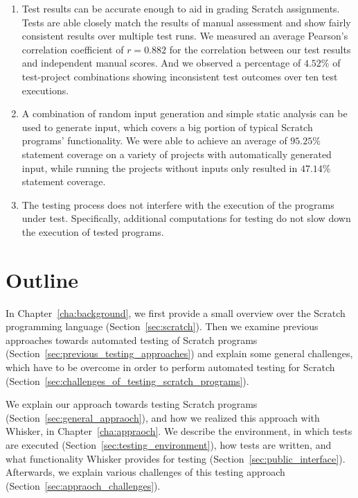 \begin{enumerate}[(1)]
    \item Test results can be accurate enough to aid in grading Scratch assignments.
        Tests are able closely match the results of manual assessment and show fairly consistent results over multiple test runs.
        We measured an average Pearson's correlation coefficient of $r = 0.882$ for the correlation
        between our test results and independent manual scores.
        And we observed a percentage of $4.52\%$ of test-project combinations showing inconsistent test outcomes over ten test executions.
    \item %
        A combination of random input generation and simple static analysis can be used to generate input, which covers a big portion of
        typical Scratch programs' functionality.
        We were able to achieve an average of $95.25\%$ statement coverage on a variety of projects with automatically generated input,
        while running the projects without inputs only resulted in $47.14\%$ statement coverage.
    \item The testing process does not interfere with the execution of the programs under test.
        Specifically, additional computations for testing do not slow down the execution of tested programs.
\end{enumerate}

\section{Outline}

In Chapter~\ref{cha:background}, we first provide a small overview over the Scratch programming language (Section~\ref{sec:scratch}).
Then we examine previous approaches towards automated testing of Scratch programs (Section~\ref{sec:previous_testing_approaches})
and explain some general challenges, which have to be overcome in order to perform automated testing for Scratch (Section~\ref{sec:challenges_of_testing_scratch_programs}).%
\parspace

We explain our approach towards testing Scratch programs (Section~\ref{sec:general_appraoch}),
and how we realized this approach with Whisker, in Chapter~\ref{cha:appraoch}.
We describe the environment, in which tests are executed (Section~\ref{sec:testing_environment}),
how tests are written, and what functionality Whisker provides for testing (Section~\ref{sec:public_interface}).
Afterwards, we explain various challenges of this testing approach (Section~\ref{sec:appraoch_challenges}).
\parspace

